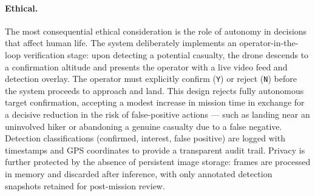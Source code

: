 \paragraph{Ethical.}
The most consequential ethical consideration is the role of autonomy in decisions that affect human life. The system deliberately implements an operator-in-the-loop verification stage: upon detecting a potential casualty, the drone descends to a confirmation altitude and presents the operator with a live video feed and detection overlay. The operator must explicitly confirm (\texttt{Y}) or reject (\texttt{N}) before the system proceeds to approach and land. This design rejects fully autonomous target confirmation, accepting a modest increase in mission time in exchange for a decisive reduction in the risk of false-positive actions --- such as landing near an uninvolved hiker or abandoning a genuine casualty due to a false negative. Detection classifications (confirmed, interest, false positive) are logged with timestamps and GPS coordinates to provide a transparent audit trail. Privacy is further protected by the absence of persistent image storage: frames are processed in memory and discarded after inference, with only annotated detection snapshots retained for post-mission review.
